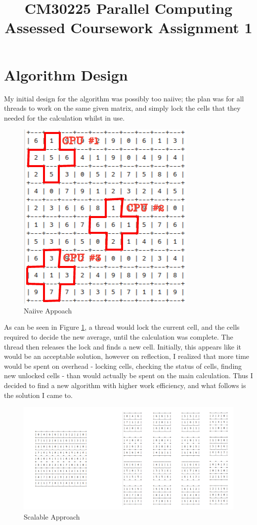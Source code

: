 \documentclass{article}
\title{CM30225 Parallel Computing
Assessed Coursework Assignment 1}
\author{}
\begin{document}
\maketitle
\section{Algorithm Design}
My initial design for the algorithm was possibly too naiive; the plan was for all threads to work on the same given matrix, and simply lock the cells that they needed for the calculation whilst in use. 
    \begin{figure}[H]
        \centering
        \includegraphics[scale=0.5]{1.png}
        \caption{Naiive Appoach}
        \label{fig1}
    \end{figure}
As can be seen in Figure \ref{fig1}, a thread would lock the current cell, and the cells required to decide the new average, until the calculation was complete. The thread then releases the lock and finds a new cell. Initially, this appears like it would be an acceptable solution, however on reflection, I realized that more time would be spent on overhead - locking cells, checking the status of cells, finding new unlocked cells - than would actually be spent on the main calculation. Thus I decided to find a new algorithm with higher work efficiency, and what follows is the solution I came to.\\
\begin{figure}
    \centering
    \includegraphics[scale=1.6]{2.png}
    \caption{Scalable Approach}
    \label{fig2}
\end{figure}
\end{document}
